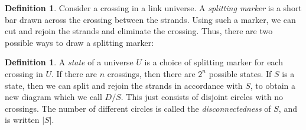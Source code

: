 \documentclass[reqno]{amsart}
\theoremstyle{definition}
\newtheorem{definition}[theorem]{Definition}
\begin{document}
\begin{definition}\label{defn-splitting-marker}
 Consider a crossing in a link universe.  A \emph{splitting marker} is
 a short bar drawn across the crossing between the strands.  Using
 such a marker, we can cut and rejoin the strands and eliminate the
 crossing.  Thus, there are two possible ways to draw a splitting
 marker:
 \begin{center}
 \end{center}
\end{definition}

\begin{definition}\label{defn-state}
 A \emph{state} of a universe $U$ is a choice of splitting marker for
 each crossing in $U$.  If there are $n$ crossings, then there are
 $2^n$ possible states.  If $S$ is a state, then we can split and
 rejoin the strands in accordance with $S$, to obtain a new diagram
 which we call $D/S$.  This just consists of disjoint circles with no
 crossings.  The number of different circles is called the
 \emph{disconnectedness} of $S$, and is written $|S|$.
\end{definition}
\end{document}

